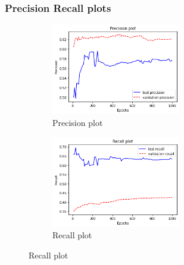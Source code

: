 \subsubsection{Precision Recall plots}
\begin{figure}[h]
    \centering
    \begin{subfigure}[b]{0.5\textwidth}
                \includegraphics[width=\textwidth,height=4cm]{tex/img/precision_plot.png}
                \caption{Precision plot}
        \end{subfigure}%
        \hfill
    \begin{subfigure}[b]{0.5\textwidth}
                \includegraphics[width=\textwidth,height=4cm]{tex/img/recall_plot.png}
                \caption{Recall plot}
       \end{subfigure}%
    \end{figure}

